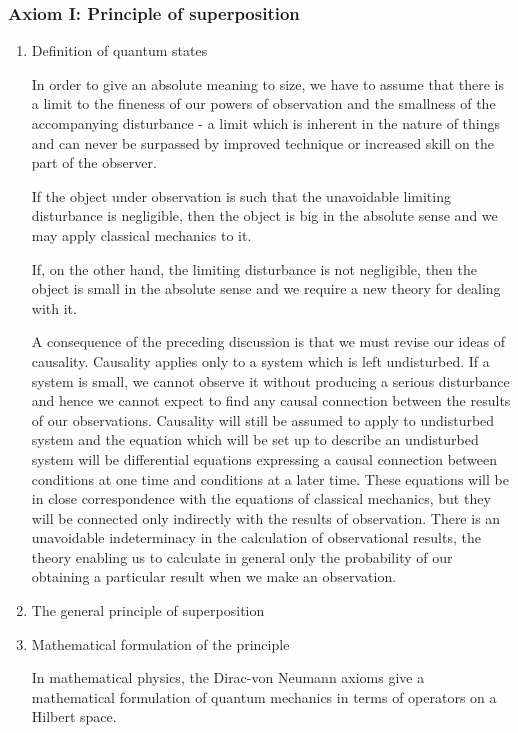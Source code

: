 \documentclass[12pt]{article}
\numberwithin{equation}{section}
\begin{document}
\subsubsection{Axiom I: Principle of superposition}
\begin{enumerate}
\item Definition of {\color{red}quantum states} \par
	In order to give {\color{orange}an absolute meaning to size}, we have to assume that there is {\color{orange}a limit to the fineness of our powers of observation} and the smallness of the accompanying disturbance - a limit which is inherent in the nature of things and can never be surpassed by improved technique or increased skill on the part of the observer. \par
	If the object under observation is such that the unavoidable limiting disturbance is negligible, then the object is big in the absolute sense and {\color{orange}we may apply classical mechanics} to it. \par
	If, on the other hand, the limiting disturbance is not negligible, then the object is small in the absolute sense and {\color{orange}we require a new theory} for dealing with it. \par
	A consequence of the preceding discussion is that we must revise our ideas of causality. {\color{orange}Causality applies only to a system which is left undisturbed}. If a system is small, we cannot observe it without producing a serious disturbance and hence we cannot expect to find any causal connection between the results of our observations. Causality will still be assumed to apply to undisturbed system and the equation which will be set up to describe an undisturbed system will be differential equations expressing a causal connection between conditions at one time and conditions at a later time. These equations will be in close correspondence with the equations of classical mechanics, but they will be connected only indirectly with the results of observation. There is an unavoidable indeterminacy in the calculation of observational results, the theory enabling us to calculate in general only the probability of our obtaining a particular result when we make an observation. \par
\item The general {\color{red}principle of superposition} \par
\item Mathematical formulation of the principle \par
	In mathematical physics, the Dirac-von Neumann axioms give a mathematical formulation of quantum mechanics in terms of operators on a Hilbert space. \par

\end{enumerate}
\end{document}
